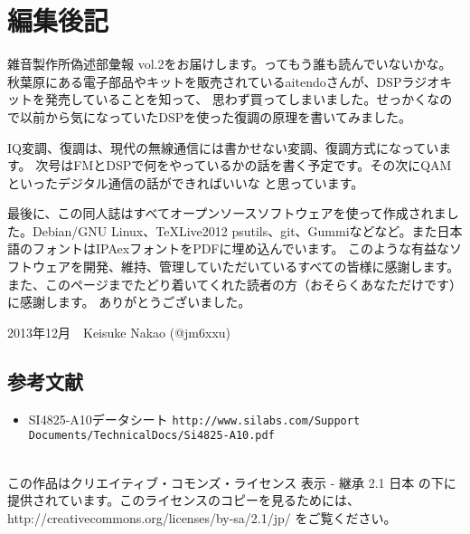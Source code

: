 \section*{編集後記}
雑音製作所偽述部彙報 vol.2をお届けします。ってもう誰も読んでいないかな。
秋葉原にある電子部品やキットを販売されているaitendoさんが、DSPラジオキットを発売していることを知って、
思わず買ってしまいました。せっかくなので以前から気になっていたDSPを使った復調の原理を書いてみました。

IQ変調、復調は、現代の無線通信には書かせない変調、復調方式になっています。
次号はFMとDSPで何をやっているかの話を書く予定です。その次にQAMといったデジタル通信の話ができればいいな
と思っています。

最後に、この同人誌はすべてオープンソースソフトウェアを使って作成されました。Debian/GNU Linux、\TeX Live2012
psutils、git、Gummiなどなど。また日本語のフォントはIPAexフォントをPDFに埋め込んでいます。
このような有益なソフトウェアを開発、維持、管理していただいているすべての皆様に感謝します。
また、このページまでたどり着いてくれた読者の方（おそらくあなただけです）に感謝します。
ありがとうございました。

\begin{flushright}
2013年12月　Keisuke Nakao (@jm6xxu) 
\end{flushright}

\subsection*{参考文献}
\begin{itemize}
  \item 
    SI4825-A10データシート \texttt{http://www.silabs.com/Support Documents/TechnicalDocs/Si4825-A10.pdf}
   \end{itemize}
\clearpage
\mbox{}
\vspace{36em}\\
この作品はクリエイティブ・コモンズ・ライセンス 表示 - 継承 2.1 日本 の下に提供されています。このライセンスのコピーを見るためには、http://creativecommons.org/licenses/by-sa/2.1/jp/ をご覧ください。
